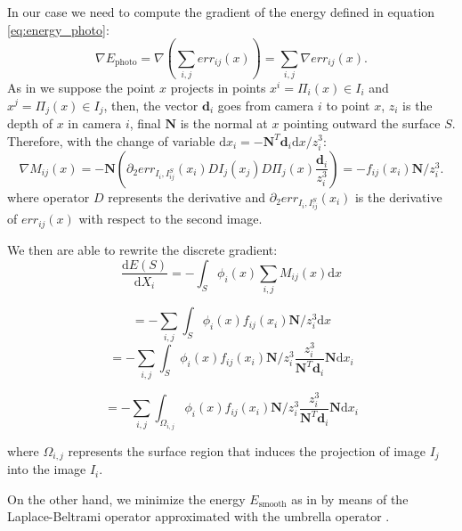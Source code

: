 In our case we need to compute the gradient of the energy defined in equation \eqref{eq:energy_photo}:
\begin{equation}
  \nabla E_{\textrm{photo}} = \nabla (\sum_{i,j} err_{ij}(x)) = \sum_{i,j} \nabla err_{ij}(x).
\end{equation}
As in \cite{pons2007multi} we suppose the point $x$ projects in points $x^i = \Pi_i(x) \in I_i$ and  $x^j = \Pi_j(x) \in I_j$, then, the vector $\mathbf{d}_i$ goes from camera $i$ to point $x$, $z_i$ is the depth of $x$ in camera $i$, final $\mathbf{N}$ is the normal at $x$ pointing outward the surface $\mathit{S}$. 
Therefore, with the change of variable $\textrm{d}x_i = -\mathbf{N}^T \mathbf{d}_i \textrm{d}x/z_i^3$:
\begin{equation}
  \nabla \mathit{M}_{ij}(x) = -\mathbf{N} \left( \partial_2 err_{I_i, I_{ij}^{\mathit{S}}}(x_i) DI_j(x_j) D\Pi_j(x)\frac{\mathbf{d}_i}{z_i^3}\right) = - f_{ij}(x_i) \mathbf{N}/z_i^3.
\end{equation}
where operator $D$ represents the derivative and $\partial_2 err_{I_i, I_{ij}^{\mathit{S}}}(x_i)$ is the derivative of $err_{ij}(x)$ with respect to the second image.


We then are able to rewrite the discrete gradient:
\begin{equation}
  \frac{\textrm{d}E(\mathit{S})}{\textrm{d}X_i} =  - \int_{\mathit{S}} \phi_i(x) \sum_{i,j} \mathit{M}_{ij}(x) \textrm{d}x 
\end{equation}

\begin{equation}
  =  - \sum_{i,j} \int_{\mathit{S}} \phi_i(x)  f_{ij}(x_i)  \mathbf{N}/z_i^3 \textrm{d}x 
\end{equation}
\begin{equation}
  =  - \sum_{i,j} \int_{\mathit{S}} \phi_i(x)  f_{ij}(x_i)  \mathbf{N}/z_i^3 \frac{z_i^3}{\mathbf{N}^T \mathbf{d}_i }\mathbf{N} \textrm{d}x_i
\end{equation}

\begin{equation}
\label{eq:final}
  =  - \sum_{i,j} \int_{\mathit{\Omega_{i,j}}} \phi_i(x)  f_{ij}(x_i)  \mathbf{N}/z_i^3 \frac{z_i^3}{\mathbf{N}^T \mathbf{d}_i }\mathbf{N} \textrm{d}x_i
\end{equation}

where $\Omega_{i,j}$ represents the surface region that induces the projection of image $I_j$ into the image $I_i$.

On the other hand, we minimize the energy $E_{\textrm{smooth}}$ as in \cite{vu_et_al_2012} by means of the Laplace-Beltrami operator approximated with the umbrella operator \cite{wardetzky2007discrete}.


